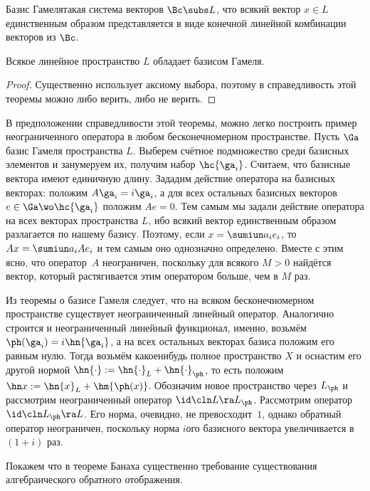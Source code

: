 \documentclass[a4paper]{article}
\begin{document}
\begin{df}
Базис Гамеля\т такая система векторов $\Bc \subs L$,
что всякий вектор $x \in L$ единственным образом представляется в виде конечной линейной комбинации
векторов из $\Bc$.
\end{df}

\begin{theorem}
Всякое линейное пространство $L$ обладает базисом Гамеля.
\end{theorem}
\begin{proof}
Существенно использует аксиому выбора, поэтому в справедливость этой теоремы
можно либо верить, либо не верить.
\end{proof}

В предположении справедливости этой теоремы, можно легко построить пример
неограниченного оператора в любом бесконечномерном пространстве. Пусть $\Ga$\т
базис Гамеля пространства $L$. Выберем счётное подмножество среди базисных элементов
и занумеруем их, получим набор $\hc{\ga_i}$. Считаем, что базисные вектора имеют единичную
длину. Зададим действие оператора на базисных векторах: положим $A\ga_i = i\ga_i$,
а для всех остальных базисных векторов $e \in \Ga \wo \hc{\ga_i}$ положим $Ae = 0$. Тем самым
мы задали действие оператора на всех векторах пространства $L$, ибо всякий вектор
единственным образом разлагается по нашему базису. Поэтому, если $x = \sumiun a_i e_i$,
то $Ax = \sumiun a_i Ae_i$ и тем самым оно однозначно определено. Вместе с этим ясно, что оператор~$A$
неограничен, поскольку для всякого $M > 0$ найдётся вектор, который растягивается этим оператором
больше, чем в $M$ раз.

\begin{ex}
Из теоремы о базисе Гамеля следует, что на всяком бесконечномерном пространстве
существует неограниченный линейный оператор.
Аналогично строится и неограниченный линейный функционал,
именно, возьмём $\ph(\ga_i) = i\hn{\ga_i}$, а на всех остальных векторах базиса положим его
равным нулю. Тогда возьмём какое\д нибудь полное пространство $X$ и оснастим его другой
нормой $\hn{\cdot} := \hn{\cdot}_L + \hn{\cdot}_\ph$, то есть
положим $\hn x := \hn{x}_L + \hm{\ph(x)}$. Обозначим новое пространство через $L_\ph$
и рассмотрим неограниченный оператор $\id\cln L \ra L_\ph$.
Рассмотрим оператор $\id\cln L_\ph \ra L$. Его норма, очевидно, не превосходит~$1$,
однако обратный оператор неограничен, поскольку норма $i$\д ого базисного вектора
увеличивается в $(1+i)$ раз.
\end{ex}

Покажем что в теореме Банаха существенно требование существования алгебраического
обратного отображения.
\end{document}
